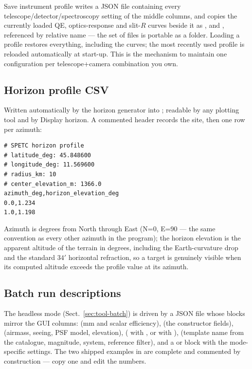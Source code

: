\textsf{Save instrument profile} writes a JSON file containing every
telescope/detector/spectroscopy setting of the middle columns, and copies
the currently loaded QE, optics-response and slit-$R$ curves beside it as
,  and
, referenced by relative name --- the set of
files is portable as a folder. Loading a profile restores everything,
including the curves; the most recently used profile is reloaded
automatically at start-up. This is the mechanism to maintain one
configuration per telescope+camera combination you own.

\subsection{Horizon profile CSV}
\label{sec:file-horizon}

Written automatically by the horizon generator into
; readable by
any plotting tool and by \textsf{Display horizon}. A commented header
records the site, then one row per azimuth:

\begin{verbatim}
# SPETC horizon profile
# latitude_deg: 45.848600
# longitude_deg: 11.569600
# radius_km: 10
# center_elevation_m: 1366.0
azimuth_deg,horizon_elevation_deg
0.0,1.234
1.0,1.198
\end{verbatim}

Azimuth is degrees from North through East (N=0, E=90 --- the same
convention as every other azimuth in the program); the horizon elevation
is the apparent altitude of the terrain in degrees, including the
Earth-curvature drop and the standard $34'$ horizontal refraction, so a
target is genuinely visible when its computed altitude exceeds the
profile value at its azimuth.

\subsection{Batch run descriptions}

The headless mode (Sect.~\ref{sec:tool-batch}) is driven by a JSON file
whose blocks mirror the GUI columns:  (mm and scalar
efficiency),  (the  constructor fields),
 (airmass, seeing, PSF model, elevation),
 ( with , or
 with ), 
(template name from the catalogue, magnitude, system, reference filter),
and a  or  block with the
mode-specific settings. The two shipped examples in  are
complete and commented by construction --- copy one and edit the numbers.
